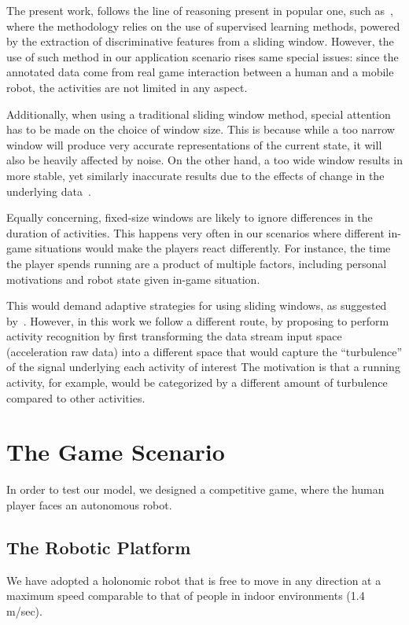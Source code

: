 The present work, follows the line of reasoning present in popular one, such as~\cite{ravi_activity_2005, bao_activity_2004}, where the methodology relies on the use of supervised learning methods, powered by the extraction of discriminative features from a sliding window. However, the use of such method in our application scenario rises same special issues: since the annotated data come from real game interaction between a human and a mobile robot, the activities are not limited in any aspect.

Additionally, when using a traditional sliding window method, special attention has to be made on the choice of window size. This is because while a too narrow window will produce very accurate representations of the current state, it will also be heavily affected by noise. On the other hand, a too wide window results in more stable, yet similarly inaccurate results due to the effects of change in the underlying data~\cite{bifet_learning_2007}. 

Equally concerning, fixed-size windows are likely to ignore differences in the duration of activities. This happens very often in our scenarios where different in-game situations would make the players react differently. For instance, the time the player spends running are a product of multiple factors, including personal motivations and robot state given in-game situation. 

This would demand adaptive strategies for using sliding windows, as suggested by~\cite{noor_adaptive_2016}. However, in this work we follow a different route, by proposing to perform activity recognition by first transforming the data stream input space (acceleration raw data) into a different space that would capture the ``turbulence'' of the signal underlying each activity of interest %
The motivation is that a running activity, for example, would be categorized by a different amount of turbulence compared to other activities.
\section{The Game Scenario}\label{gamescenario}
In order to test our model, we designed a competitive game, where the human player faces an autonomous robot.

\subsection{The Robotic Platform}\label{roboplat} 
We have adopted a holonomic robot that is free to move in any direction at a maximum speed comparable to that of people in indoor environments (1.4 m/sec).

